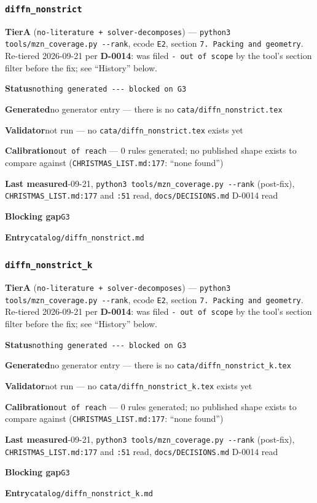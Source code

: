 \documentclass[10pt,a4paper]{article}
\newcommand{\entryfield}[2]{{\raggedright\textbf{#1}\quad #2\par}}
\begin{document}
\subsubsection*{\texttt{diffn\_\allowbreak{}nonstrict}}
\label{entry:diffn-nonstrict}
\entryfield{Tier}{\textbf{A} (\texttt{no-\allowbreak{}literature + solver-\allowbreak{}decomposes}) --- \texttt{python3 tools/\allowbreak{}mzn\_\allowbreak{}coverage.\allowbreak{}py -\allowbreak{}-\allowbreak{}rank}, ecode \texttt{E2}, section \texttt{7. Packing and geometry}. Re-tiered 2026-09-21 per \textbf{D-0014}: was filed \texttt{- out of scope} by the tool's section filter before the fix; see ``History'' below.}
\entryfield{Status}{\texttt{nothing generated -\allowbreak{}-\allowbreak{}-\allowbreak{} blocked on G3}}
\entryfield{Generated}{no generator entry --- there is no \texttt{cata/diffn\_nonstrict.tex}}
\entryfield{Validator}{not run --- no \texttt{cata/diffn\_nonstrict.tex} exists yet}
\entryfield{Calibration}{\texttt{out of reach} --- 0 rules generated; no published shape exists to compare against (\texttt{CHRISTMAS\_LIST.md:177}: ``none found'')}
\entryfield{Last measured}{2026-09-21, \texttt{python3 tools/\allowbreak{}mzn\_\allowbreak{}coverage.\allowbreak{}py -\allowbreak{}-\allowbreak{}rank} (post-fix), \texttt{CHRISTMAS\_LIST.md:177} and \texttt{:51} read, \texttt{docs/DECISIONS.md} D-0014 read}
\entryfield{Blocking gap}{\texttt{G3}}
\entryfield{Entry}{\texttt{catalog/diffn\_nonstrict.md}}
\subsubsection*{\texttt{diffn\_\allowbreak{}nonstrict\_\allowbreak{}k}}
\label{entry:diffn-nonstrict-k}
\entryfield{Tier}{\textbf{A} (\texttt{no-\allowbreak{}literature + solver-\allowbreak{}decomposes}) --- \texttt{python3 tools/\allowbreak{}mzn\_\allowbreak{}coverage.\allowbreak{}py -\allowbreak{}-\allowbreak{}rank}, ecode \texttt{E2}, section \texttt{7. Packing and geometry}. Re-tiered 2026-09-21 per \textbf{D-0014}: was filed \texttt{- out of scope} by the tool's section filter before the fix; see ``History'' below.}
\entryfield{Status}{\texttt{nothing generated -\allowbreak{}-\allowbreak{}-\allowbreak{} blocked on G3}}
\entryfield{Generated}{no generator entry --- there is no \texttt{cata/\allowbreak{}diffn\_\allowbreak{}nonstrict\_\allowbreak{}k.\allowbreak{}tex}}
\entryfield{Validator}{not run --- no \texttt{cata/\allowbreak{}diffn\_\allowbreak{}nonstrict\_\allowbreak{}k.\allowbreak{}tex} exists yet}
\entryfield{Calibration}{\texttt{out of reach} --- 0 rules generated; no published shape exists to compare against (\texttt{CHRISTMAS\_LIST.md:177}: ``none found'')}
\entryfield{Last measured}{2026-09-21, \texttt{python3 tools/\allowbreak{}mzn\_\allowbreak{}coverage.\allowbreak{}py -\allowbreak{}-\allowbreak{}rank} (post-fix), \texttt{CHRISTMAS\_LIST.md:177} and \texttt{:51} read, \texttt{docs/DECISIONS.md} D-0014 read}
\entryfield{Blocking gap}{\texttt{G3}}
\entryfield{Entry}{\texttt{catalog/diffn\_nonstrict\_k.md}}
\end{document}
